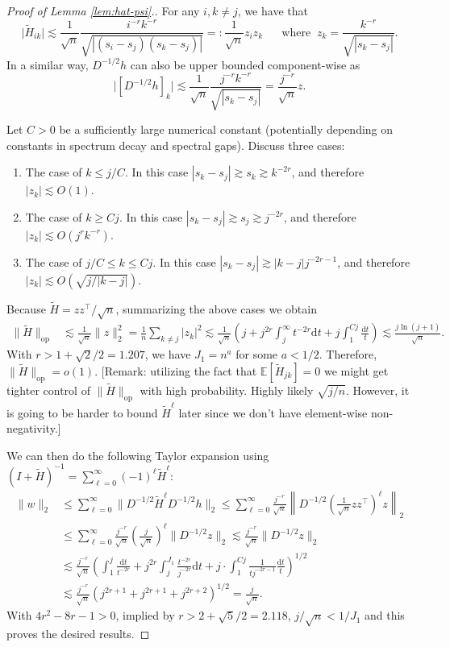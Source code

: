 \documentclass[11pt,a4paper]{article}
\renewcommand{\tilde}{\widetilde}
\theoremstyle{definition}
\theoremstyle{plain}
\theoremstyle{remark}
\newcommand{\op}{\mathrm{op}}
\newcommand{\ud}{\mathrm d}
\begin{document}
\begin{proof}[Proof of Lemma \ref{lem:hat-psi}.]
For any $i,k\neq j$, we have that
$$
\big|\tilde H_{ik}\big| \lesssim \frac{1}{\sqrt{n}} \frac{i^{-r}k^{-r}}{\sqrt{|(s_i-s_j)(s_k-s_j)|}} =: \frac{1}{\sqrt{n}}z_iz_k\;\;\;\;\;\;\text{where}\;\; z_k = \frac{k^{-r}}{\sqrt{|s_k-s_j|}}.
$$
In a similar way, $D^{-1/2}h$ can also be upper bounded component-wise as
$$
\big|[D^{-1/2}h]_k \big| \lesssim \frac{1}{\sqrt{n}}\frac{j^{-r}k^{-r}}{\sqrt{|s_k-s_j|}} = \frac{j^{-r}}{\sqrt{n}}z.
$$

Let $C>0$ be a sufficiently large numerical constant (potentially depending on constants in spectrum decay and spectral gaps). Discuss three cases:
\begin{enumerate}
\item The case of $k\leq j/C$. In this case $|s_k-s_j|\gtrsim s_k \gtrsim k^{-2r}$, and therefore $|z_k|\lesssim O(1)$.
\item The case of $k\geq Cj$. In this case $|s_k-s_j|\gtrsim s_j \gtrsim j^{-2r}$, and therefore $|z_k|\lesssim O(j^rk^{-r})$.
\item The case of $j/C\leq k\leq Cj$. In this case $|s_k-s_j| \gtrsim |k-j| j^{-2r-1}$, and therefore $|z_k|\lesssim O(\sqrt{j/|k-j|})$.
\end{enumerate}
Because $\tilde H=zz^\top/\sqrt{n}$, summarizing the above cases we obtain
\begin{align}
\|\tilde H\|_\op &\lesssim \frac{1}{\sqrt{n}}\|z\|_2^2 = \frac{1}{n}\sum_{k\neq j}|z_k|^2  \lesssim \frac{1}{\sqrt{n}}\left(j + j^{2r}\int_j^{\infty}t^{-2r}\ud t + j\int_1^{Cj} \frac{\ud t}{t}\right) \lesssim \frac{j\ln (j+1)}{\sqrt{n}}.
\end{align}
With $r>1+\sqrt{2}/2=1.207$, we have $J_1=n^{a}$ for some $a<1/2$. Therefore, $\|\tilde H\|_\op = o(1)$.
{\color{blue}[Remark: utilizing the fact that $\mathbb E[\tilde H_{jk}]=0$ we might get tighter control of $\|\tilde H\|_\op$ with high probability. Highly likely $\sqrt{j/n}$. However, it is going to be harder to bound $\tilde H^\ell$ later since we don't have element-wise non-negativity.]}

We can then do the following Taylor expansion using $(I+\tilde H)^{-1} = \sum_{\ell=0}^{\infty} (-1)^\ell \tilde H^\ell$:
\begin{align*}
\|w\|_2 &\leq \sum_{\ell=0}^{\infty} \|D^{-1/2}\tilde H^\ell D^{-1/2}h\|_2 \leq \sum_{\ell=0}^{\infty} \frac{j^{-r}}{\sqrt{n}}\left\|D^{-1/2}\left(\frac{1}{\sqrt{n}}zz^\top\right)^\ell z\right\|_2\\
&\leq \sum_{\ell=0}^{\infty}\frac{j^{-r}}{\sqrt{n}}\left(\frac{j}{\sqrt{n}}\right)^\ell \|D^{-1/2}z\|_2 \lesssim \frac{j^{-r}}{\sqrt{n}}\|D^{-1/2}z\|_2\\
&\lesssim \frac{j^{-r}}{\sqrt{n}}\left(\int_1^j \frac{\ud t}{t^{-2r}} + j^{2r}\int_j^{J_1}\frac{t^{-2r}}{j^{-2r}}\ud t + j\cdot \int_1^{Cj}\frac{1}{tj^{-2r-1}}\frac{\ud t}{t}\right)^{1/2}\\
&\lesssim \frac{j^{-r}}{\sqrt{n}}\left(j^{2r+1} + j^{2r+1} + j^{2r+2}\right)^{1/2} = \frac{j}{\sqrt{n}}.
\end{align*}
With $4r^2-8r-1>0$, implied by $r>2+\sqrt{5}/2=2.118$, $j/\sqrt{n}<1/J_1$ and this proves the desired results.
\end{proof}



\end{document}
